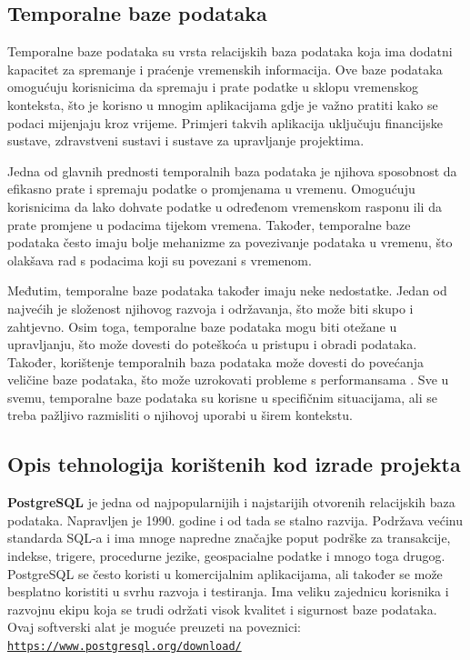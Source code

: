 \documentclass[]{foi} %
\begin{document}
\subsection{Temporalne baze podataka}

Temporalne baze podataka \cite{tbp} su vrsta relacijskih baza podataka koja ima dodatni kapacitet za spremanje i praćenje vremenskih informacija. Ove baze podataka omogućuju korisnicima da spremaju i prate podatke u sklopu vremenskog konteksta, što je korisno u mnogim aplikacijama gdje je važno pratiti kako se podaci mijenjaju kroz vrijeme. Primjeri takvih aplikacija uključuju financijske sustave, zdravstveni sustavi i sustave za upravljanje projektima.

Jedna od glavnih prednosti temporalnih baza podataka je njihova sposobnost da efikasno prate i spremaju podatke o promjenama u vremenu. Omogućuju korisnicima da lako dohvate podatke u određenom vremenskom rasponu ili da prate promjene u podacima tijekom vremena. Također, temporalne baze podataka često imaju bolje mehanizme za povezivanje podataka u vremenu, što olakšava rad s podacima koji su povezani s vremenom.

Međutim, temporalne baze podataka također imaju neke nedostatke. Jedan od najvećih je složenost njihovog razvoja i održavanja, što može biti skupo i zahtjevno. Osim toga, temporalne baze podataka mogu biti otežane u upravljanju, što može dovesti do poteškoća u pristupu i obradi podataka. Također, korištenje temporalnih baza podataka može dovesti do povećanja veličine baze podataka, što može uzrokovati probleme s performansama \cite{tbp}. Sve u svemu, temporalne baze podataka su korisne u specifičnim situacijama, ali se treba pažljivo razmisliti o njihovoj uporabi u širem kontekstu.
\newpage

\subsection{Opis tehnologija korištenih kod izrade projekta}

\textbf{PostgreSQL} \cite{postgres} je jedna od najpopularnijih i najstarijih otvorenih relacijskih baza podataka. Napravljen je 1990. godine i od tada se stalno razvija. Podržava većinu standarda SQL-a i ima mnoge napredne značajke poput podrške za transakcije, indekse, trigere, procedurne jezike, geospacialne podatke i mnogo toga drugog. PostgreSQL se često koristi u komercijalnim aplikacijama, ali također se može besplatno koristiti u svrhu razvoja i testiranja. Ima veliku zajednicu korisnika i razvojnu ekipu koja se trudi održati visok kvalitet i sigurnost baze podataka. Ovaj softverski alat je moguće preuzeti na poveznici:\\ \texttt{\href{https://www.postgresql.org/download/}{https://www.postgresql.org/download/}}
\end{document}
